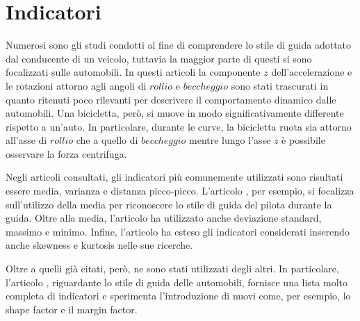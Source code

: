 \documentclass[class=article]{standalone}
\begin{document}
\section{Indicatori}
	Numerosi sono gli studi condotti al fine di comprendere lo stile di guida adottato dal conducente di un veicolo, tuttavia la maggior parte di questi si sono focalizzati sulle automobili.
	In questi articoli la componente \(z\) dell'accelerazione e le rotazioni attorno agli angoli di \(rollio\) e \(beccheggio\) sono stati trascurati in quanto ritenuti poco rilevanti per descrivere il comportamento dinamico dalle automobili.
	Una bicicletta, però, si muove in modo significativamente differente rispetto a un'auto.
	In particolare, durante le curve, la bicicletta ruota sia attorno all'asse di \(rollio\) che a quello di \(beccheggio\) mentre lungo l'asse \(z\) è possibile osservare la forza centrifuga.
	
%	
	
	Negli articoli consultati, gli indicatori più comunemente utilizzati sono risultati essere media, varianza e distanza picco-picco. L'articolo \cite{transfun}, per esempio, si focalizza sull'utilizzo della media per riconoscere lo stile di guida del pilota durante la guida. Oltre alla media, l'articolo \cite{MA2021106096} ha utilizzato anche deviazione standard, massimo e minimo. Infine, l'articolo \cite{D&RSense} ha esteso gli indicatori considerati inserendo anche skewness e kurtosis nelle sue ricerche.
	
	Oltre a quelli già citati, però, ne sono stati utilizzati degli altri. In particolare, l'articolo \cite{chen}, riguardante lo stile di guida delle automobili, fornisce una lista molto completa di indicatori e sperimenta l'introduzione di nuovi come, per esempio, lo shape factor e il margin factor.\hfill\break
	
\end{document}
